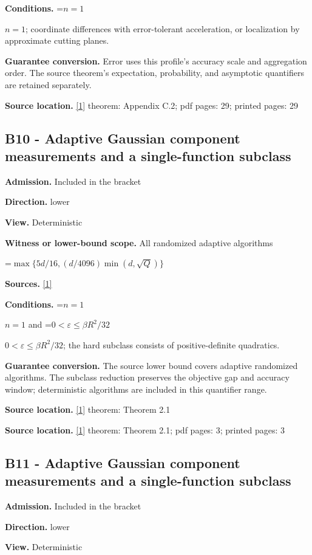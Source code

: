 \documentclass[10pt,a4paper]{article}
\newcommand{\AtlasMath}[1]{\par\begingroup\centering\setbox0=\hbox{$\displaystyle #1$}\ifdim\wd0>1.4\linewidth\typeout{ATLAS WIDE FORMULA: \the\wd0}\fi\ifdim\wd0>\linewidth\resizebox{\linewidth}{!}{\box0}\else\box0\fi\par\endgroup}
\newcommand{\AtlasInlineMath}[1]{\begingroup\setbox0=\hbox{$#1$}\ifdim\wd0>.4\linewidth\endgroup\AtlasMath{#1}\else\endgroup$#1$\fi}
\begin{document}
\textbf{Conditions.} \AtlasInlineMath{n=1}; coordinate differences with error-tolerant acceleration, or localization by approximate cutting planes.

\textbf{Guarantee conversion.} Error uses this profile's accuracy scale and aggregation order. The source theorem's expectation, probability, and asymptotic quantifiers are retained separately.

\textbf{Source location.} \href{https://arxiv.org/html/2610.00345v1}{[1]} theorem: Appendix C.2; pdf pages: 29; printed pages: 29

\subsection{B10 - Adaptive Gaussian component measurements and a single-function subclass}
\textbf{Admission.} Included in the bracket

\textbf{Direction.} lower

\textbf{View.} Deterministic

\textbf{Witness or lower-bound scope.} All randomized adaptive algorithms

\AtlasMath{\max\{5d/16,(d/4096)\min(d,\sqrt Q)\}}
\textbf{Sources.} \href{https://arxiv.org/html/2610.00345v1}{[1]}

\textbf{Conditions.} \AtlasInlineMath{n=1} and \AtlasInlineMath{0<\varepsilon\le\beta R^2/32}; the hard subclass consists of positive-definite quadratics.

\textbf{Guarantee conversion.} The source lower bound covers adaptive randomized algorithms. The subclass reduction preserves the objective gap and accuracy window; deterministic algorithms are included in this quantifier range.

\textbf{Source location.} \href{https://arxiv.org/html/2610.00345v1}{[1]} theorem: Theorem 2.1

\textbf{Source location.} \href{https://arxiv.org/html/2610.00345v1}{[1]} theorem: Theorem 2.1; pdf pages: 3; printed pages: 3

\subsection{B11 - Adaptive Gaussian component measurements and a single-function subclass}
\textbf{Admission.} Included in the bracket

\textbf{Direction.} lower

\textbf{View.} Deterministic
\end{document}
